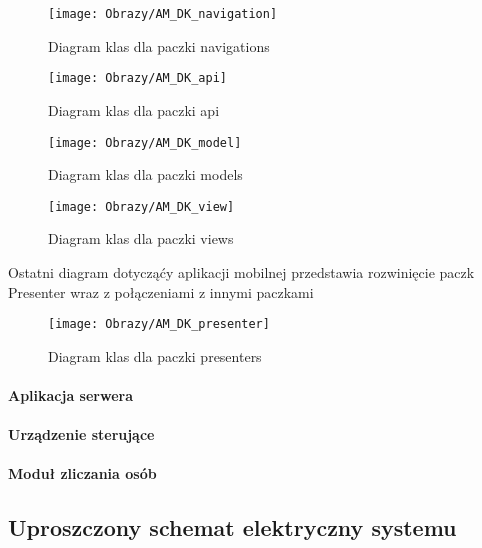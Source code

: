	
		\begin{figure}[ht!]
		\centering
		\texttt{[image: Obrazy/AM\_DK\_navigation]}
		\caption{Diagram klas dla paczki navigations}
		\label{Diagram klas dla paczki navigations}
	\end{figure}

	
	
	
	
	\begin{figure}[ht!]
		\centering
		\texttt{[image: Obrazy/AM\_DK\_api]}
		\caption{Diagram klas dla paczki api}
		\label{Diagram klas dla paczki api}
	\end{figure}

	

	\begin{figure}[ht!]
		\centering
		\texttt{[image: Obrazy/AM\_DK\_model]}
		\caption{Diagram klas dla paczki models}
		\label{Diagram klas dla paczki models}
	\end{figure}

	
\begin{figure}[ht!]
	\centering
	\texttt{[image: Obrazy/AM\_DK\_view]}
	\caption{Diagram klas dla paczki views}
	\label{Diagram klas dla paczki views}
\end{figure}

		
			Ostatni diagram dotycząćy aplikacji mobilnej przedstawia rozwinięcie paczk Presenter wraz z połączeniami z innymi paczkami
		\begin{figure}[ht!]
			\centering
			\texttt{[image: Obrazy/AM\_DK\_presenter]}
			\caption{Diagram klas dla paczki presenters}
			\label{Diagram klas dla paczki presenters}
		\end{figure}
		
		\newpage
		\paragraph{Aplikacja serwera}
		\paragraph{Urządzenie sterujące}
		\paragraph{Moduł zliczania osób}

\newpage		
\subsection{Uproszczony schemat elektryczny systemu}


